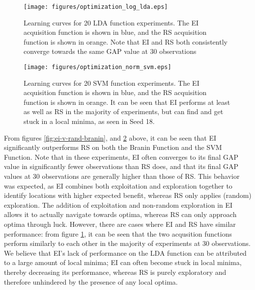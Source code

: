 \documentclass[11pt]{article}
\numberwithin{equation}{section}
\begin{document}
\begin{figure}[H]
  \centering
  \texttt{[image: figures/optimization\_log\_lda.eps]}
  \caption{Learning curves for 20 LDA function experiments. The EI acquisition function is shown in blue, and the RS acquisition function is shown in orange. 
  Note that EI and RS both consistently converge towards the same GAP value at 30 observations}
  \label{fig:ei-v-rand-lda}
\end{figure}
\begin{figure}[H]
  \centering
  \texttt{[image: figures/optimization\_norm\_svm.eps]}
  \caption{Learning curves for 20 SVM function experiments. The EI acquisition function is shown in blue, and the RS acquisition function is shown in orange.
  It can be seen that EI performs at least as well as RS in the majority of experiments, but can find and get stuck in a local minima, as seen in Seed 18.}
  \label{fig:ei-v-rand-svm}
\end{figure}
From figures \ref{fig:ei-v-rand-branin}, and \ref{fig:ei-v-rand-svm} above, it can be seen that EI significantly outperforms RS on both the Branin Function and the SVM Function.
Note that in these experiments, EI often converges to its final GAP value in significantly fewer observations than RS does, and that its final GAP values at 30 observations are generally higher than those of RS.
This behavior was expected, as EI combines both exploitation and exploration together to identify locations with higher expected benefit, whereas RS only applies (random) exploration.
The addition of exploitation and non-random exploration in EI allows it to actually navigate towards optima, whereas RS can only approach optima through luck. 
However, there are cases where EI and RS have similar performance: from figure \ref{fig:ei-v-rand-lda}, it can be seen that the two acqusition functions perform similarly to each other in the majority of experiments at 30 observations. 
We believe that EI's lack of performance on the LDA function can be attributed to a large amount of local minima; EI can often become stuck in local minima, thereby decreasing its performance, whereas RS is purely exploratory and therefore unhindered by the presence of any local optima.
\end{document}
